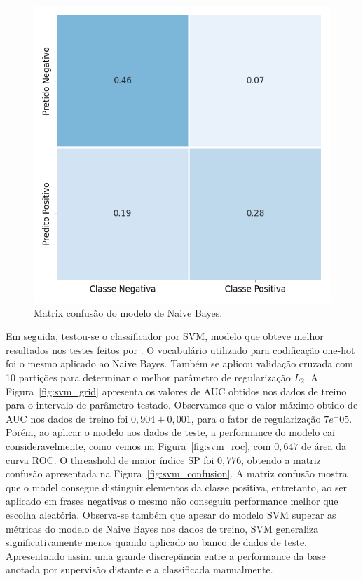 \begin{figure}[h]
\begin{center} {
    \begin{center}
    \includegraphics[scale=0.65]{images/nb_cm.png}
    \caption{Matrix confusão do modelo de Naive Bayes.}
    \label{fig:nb_confusion}
    \end{center}
}
\end{center}
\end{figure}

Em seguida, testou-se o classificador por SVM, modelo que obteve melhor
resultados nos testes feitos por \citet{go09}.
O vocabulário utilizado para codificação one-hot foi o mesmo aplicado ao
Naive Bayes.
Também se aplicou validação cruzada com 10 partições para determinar o melhor
parâmetro de regularização $L_2$.
A Figura~\ref{fig:svm_grid} apresenta os valores de AUC obtidos nos dados de
treino para o intervalo de parâmetro testado.
Observamos que o valor máximo obtido de AUC nos dados de treino foi
$0,904 \pm 0,001$, para o fator de regularização $7e^-05$.
Porém, ao aplicar o modelo aos dados de teste, a performance do modelo cai
consideravelmente, como vemos na Figura~\ref{fig:svm_roc}, com $0,647$ de área
da curva ROC.
O threashold de maior índice SP foi $0,776$, obtendo a matriz confusão
apresentada na Figura~\ref{fig:svm_confusion}.
A matriz confusão mostra que o model consegue distinguir elementos da classe
positiva, entretanto, ao ser aplicado em frases negativas o mesmo não conseguiu
performance melhor que escolha aleatória.
Observa-se também que apesar do modelo SVM superar as métricas do modelo de
Naive Bayes nos dados de treino, SVM generaliza significativamente menos quando
aplicado ao banco de dados de teste.
Apresentando assim uma grande discrepância entre a performance da base anotada
por supervisão distante e a classificada manualmente.

